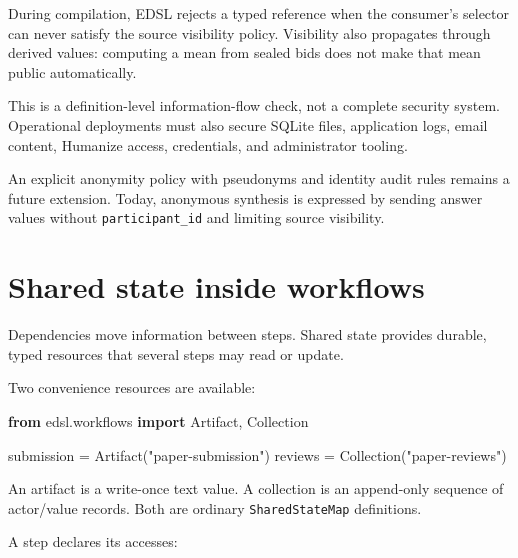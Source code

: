 \documentclass[
  10pt,
]{report}
\newenvironment{Shaded}{}{}
\newcommand{\ImportTok}[1]{\textcolor[rgb]{0.00,0.50,0.00}{\textbf{#1}}}
\newcommand{\NormalTok}[1]{#1}
\newcommand{\OperatorTok}[1]{\textcolor[rgb]{0.40,0.40,0.40}{#1}}
\newcommand{\StringTok}[1]{\textcolor[rgb]{0.25,0.44,0.63}{#1}}
\begin{document}
During compilation, EDSL rejects a typed reference when the consumer's
selector can never satisfy the source visibility policy. Visibility also
propagates through derived values: computing a mean from sealed bids
does not make that mean public automatically.

This is a definition-level information-flow check, not a complete
security system. Operational deployments must also secure SQLite files,
application logs, email content, Humanize access, credentials, and
administrator tooling.

An explicit anonymity policy with pseudonyms and identity audit rules
remains a future extension. Today, anonymous synthesis is expressed by
sending answer values without \texttt{participant\_id} and limiting
source visibility.

\chapter{Shared state inside
workflows}\label{shared-state-inside-workflows}

Dependencies move information between steps. Shared state provides
durable, typed resources that several steps may read or update.

Two convenience resources are available:

\begin{Shaded}
\begin{Highlighting}[]
\ImportTok{from}\NormalTok{ edsl.workflows }\ImportTok{import}\NormalTok{ Artifact, Collection}

\NormalTok{submission }\OperatorTok{=}\NormalTok{ Artifact(}\StringTok{"paper{-}submission"}\NormalTok{)}
\NormalTok{reviews }\OperatorTok{=}\NormalTok{ Collection(}\StringTok{"paper{-}reviews"}\NormalTok{)}
\end{Highlighting}
\end{Shaded}

An artifact is a write-once text value. A collection is an append-only
sequence of actor/value records. Both are ordinary
\texttt{SharedStateMap} definitions.

A step declares its accesses:
\end{document}
